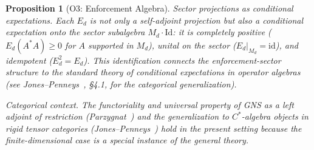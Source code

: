 \documentclass[11pt,a4paper]{article}
\newtheorem{proposition}[theorem]{Proposition}
\theoremstyle{definition}
\begin{document}
\begin{proposition}[O3: Enforcement Algebra]
\textit{Sector projections as conditional expectations.}  Each $E_d$ is not only a self-adjoint projection but also a \emph{conditional expectation} onto the sector subalgebra $M_d \cdot \mathrm{Id}$: it is completely positive ($E_d(A^*A) \ge 0$ for $A$ supported in $M_d$), unital on the sector ($E_d|_{M_d} = \mathrm{id}$), and idempotent ($E_d^2 = E_d$).  This identification connects the enforcement-sector structure to the standard theory of conditional expectations in operator algebras (see Jones--Penneys~\cite{JonesPenneys2017}, \S4.1, for the categorical generalization).

\textit{Categorical context.}  The functoriality and universal property of GNS as a left adjoint of restriction (Parzygnat~\cite{Parzygnat2018}) and the generalization to $C^*$-algebra objects in rigid tensor categories (Jones--Penneys~\cite{JonesPenneys2017}) hold in the present setting because the finite-dimensional case is a special instance of the general theory.
\end{proposition}
\end{document}
